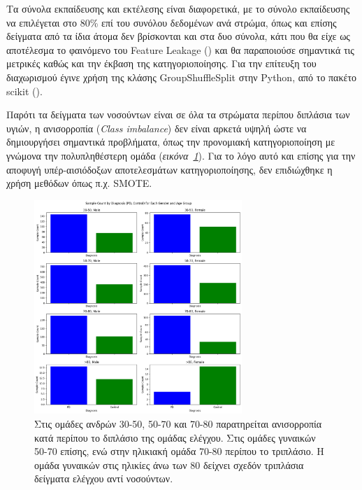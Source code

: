 \documentclass[12pt]{report}
\begin{document}
        \par
            Τα σύνολα εκπαίδευσης και εκτέλεσης είναι διαφορετικά, με το σύνολο εκπαίδευσης να επιλέγεται στο 80\% επί του συνόλου δεδομένων ανά στρώμα, όπως και επίσης δείγματα από τα ίδια άτομα δεν βρίσκονται και στα δυο σύνολα, κάτι που θα είχε ως αποτέλεσμα το φαινόμενο του Feature Leakage (\emph{\cite{Oosterhuis2024LocalPredictions}}) και θα παραποιούσε σημαντικά τις μετρικές καθώς και την έκβαση της κατηγοριοποίησης. Για την επίτευξη του διαχωρισμού έγινε χρήση της κλάσης GroupShuffleSplit στην Python, από το πακέτο scikit (\emph{\cite{Buitinck2013APIProject}}). 
        \par
            Παρότι τα δείγματα των νοσούντων είναι σε όλα τα στρώματα περίπου διπλάσια των υγιών, η ανισορροπία (\emph{Class imbalance}) δεν είναι αρκετά υψηλή ώστε να δημιουργήσει σημαντικά προβλήματα, όπως την προνομιακή κατηγοριοποίηση με γνώμονα την πολυπληθέστερη ομάδα (\emph{εικόνα~\ref{fig:ppmi-visual-bar-class-imb}}). Για το λόγο αυτό και επίσης για την αποφυγή υπέρ-αισιόδοξων αποτελεσμάτων κατηγοριοποίησης, δεν επιδιώχθηκε η χρήση μεθόδων όπως π.χ.  SMOTE.

            \begin{figure}[H]
                \centering
                \includegraphics[width=0.7\textwidth]{ML/ppmi-visual-bar-class-imb.png}
                \caption[Απεικόνιση ανισορροπίας μεταξύ των ομάδων της μελέτης] {Στις ομάδες ανδρών 30-50, 50-70 και 70-80 παρατηρείται ανισορροπία κατά περίπου το διπλάσιο της ομάδας ελέγχου. Στις ομάδες γυναικών 50-70 επίσης, ενώ στην ηλικιακή ομάδα 70-80 περίπου το τριπλάσιο. Η ομάδα γυναικών στις ηλικίες άνω των 80 δείχνει σχεδόν τριπλάσια δείγματα ελέγχου αντί νοσούντων.}
                \label{fig:ppmi-visual-bar-class-imb}
            \end{figure}
\end{document}
